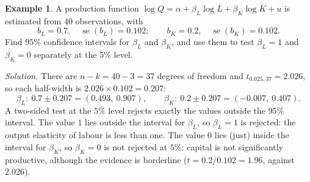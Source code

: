 \documentclass[11pt,a4paper]{article}
\numberwithin{equation}{section}
\theoremstyle{definition}
\newtheorem{exa}[thm]{Example}
\begin{document}
\begin{exa}
\label{ex:cobbci}
A production function $\log Q = \alpha + \beta_L\log L + \beta_K\log K + u$ is estimated from $40$ observations, with
\[
b_L = 0.7, \quad \operatorname{se}(b_L) = 0.102; \qquad b_K = 0.2, \quad \operatorname{se}(b_K) = 0.102 .
\]
Find $95\%$ confidence intervals for $\beta_L$ and $\beta_K$, and use them to test $\beta_L = 1$ and $\beta_K = 0$ separately at the $5\%$ level.

\emph{Solution.} There are $n - k = 40 - 3 = 37$ degrees of freedom and $t_{0.025,37} = 2.026$, so each half-width is $2.026 \times 0.102 = 0.207$:
\[
\beta_L\colon\ 0.7 \pm 0.207 = (0.493,\ 0.907), \qquad \beta_K\colon\ 0.2 \pm 0.207 = (-0.007,\ 0.407) .
\]
A two-sided test at the $5\%$ level rejects exactly the values outside the $95\%$ interval. The value $1$ lies outside the interval for $\beta_L$, so
$\beta_L = 1$ is rejected: the output elasticity of labour is less than one. The value $0$ lies (just) inside the interval for $\beta_K$, so
$\beta_K = 0$ is not rejected at $5\%$: capital is not significantly productive, although the evidence is borderline ($t = 0.2/0.102 = 1.96$, against
$2.026$).
\end{exa}
\end{document}

